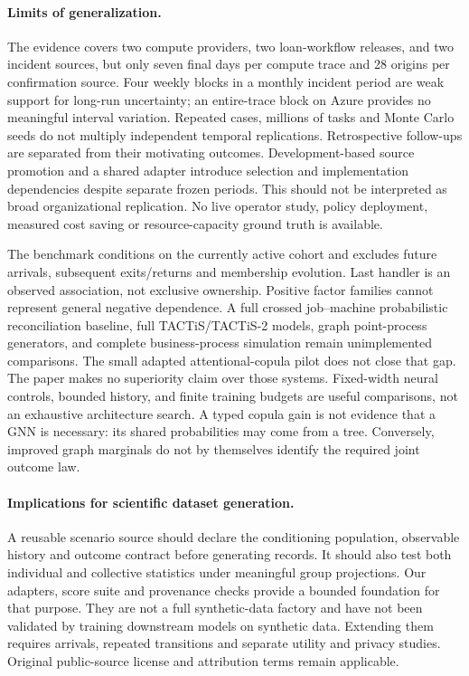 \paragraph{Limits of generalization.}
The evidence covers two compute providers, two loan-workflow releases, and two
incident sources, but only seven final days per compute trace and 28 origins
per confirmation source. Four weekly blocks in a monthly incident period
are weak support for long-run uncertainty; an entire-trace block on Azure
provides no meaningful interval variation. Repeated cases,
millions of tasks and Monte Carlo seeds do not multiply independent temporal
replications. Retrospective follow-ups are separated from their motivating
outcomes. Development-based source promotion and a shared adapter introduce
selection and implementation dependencies despite separate frozen periods.
This should not be interpreted as broad organizational replication.
No live operator study, policy deployment, measured
cost saving or resource-capacity ground truth is available.

The benchmark conditions on the currently active cohort and excludes future
arrivals, subsequent exits/returns and membership evolution. Last handler is
an observed association, not exclusive ownership. Positive factor families
cannot represent general negative dependence. A full crossed job--machine
probabilistic reconciliation baseline, full TACTiS/TACTiS-2 models, graph
point-process generators, and complete business-process simulation remain
unimplemented comparisons. The small adapted attentional-copula pilot does
not close that gap. The paper makes no superiority claim over those systems.
Fixed-width neural controls, bounded history, and finite training budgets are
useful comparisons, not an exhaustive architecture search. A typed copula
gain is not evidence that a GNN is necessary: its shared probabilities may
come from a tree. Conversely, improved graph marginals do not by themselves
identify the required joint outcome law.

\paragraph{Implications for scientific dataset generation.}
A reusable scenario source should declare the conditioning population,
observable history and outcome contract before generating records. It should
also test both individual and collective statistics under meaningful group
projections. Our adapters, score suite and provenance checks provide a bounded
foundation for that purpose. They are not a full synthetic-data factory and
have not been validated by training downstream models on synthetic data.
Extending them requires arrivals, repeated transitions and separate utility
and privacy studies. Original public-source license and attribution terms
remain applicable.
